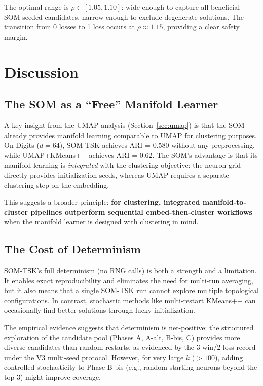 \documentclass[journal]{IEEEtran}
\begin{document}
The optimal range is $\rho \in [1.05, 1.10]$: wide enough to capture all beneficial SOM-seeded candidates, narrow enough to exclude degenerate solutions. The transition from 0 losses to 1 loss occurs at $\rho \approx 1.15$, providing a clear safety margin.

\section{Discussion}
\label{sec:discussion}

\subsection{The SOM as a ``Free'' Manifold Learner}

A key insight from the UMAP analysis (Section~\ref{sec:umap}) is that the SOM already provides manifold learning comparable to UMAP for clustering purposes. On Digits ($d=64$), SOM-TSK achieves ARI = 0.580 without any preprocessing, while UMAP+KMeans++ achieves ARI = 0.62. The SOM's advantage is that its manifold learning is \emph{integrated} with the clustering objective: the neuron grid directly provides initialization seeds, whereas UMAP requires a separate clustering step on the embedding.

This suggests a broader principle: \textbf{for clustering, integrated manifold-to-cluster pipelines outperform sequential embed-then-cluster workflows} when the manifold learner is designed with clustering in mind.

\subsection{The Cost of Determinism}

SOM-TSK's full determinism (no RNG calls) is both a strength and a limitation. It enables exact reproducibility and eliminates the need for multi-run averaging, but it also means that a single SOM-TSK run cannot explore multiple topological configurations. In contrast, stochastic methods like multi-restart KMeans++ can occasionally find better solutions through lucky initialization.

The empirical evidence suggests that determinism is net-positive: the structured exploration of the candidate pool (Phases A, A-alt, B-bis, C) provides more diverse candidates than random restarts, as evidenced by the 3-win/2-loss record under the V3 multi-seed protocol. However, for very large $k$ ($> 100$), adding controlled stochasticity to Phase B-bis (e.g., random starting neurons beyond the top-3) might improve coverage.
\end{document}
